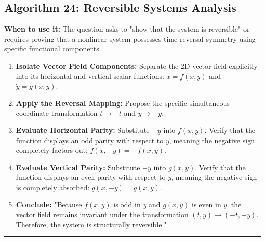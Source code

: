 \documentclass[11pt, a4paper]{report}
\begin{document}
\subsection*{Algorithm 24: Reversible Systems Analysis}
\textbf{When to use it:} The question asks to "show that the system is reversible" or requires proving that a nonlinear system possesses time-reversal symmetry using specific functional components.
\begin{enumerate}[label=\textbf{\arabic*.}]
    \item \textbf{Isolate Vector Field Components:} Separate the 2D vector field explicitly into its horizontal and vertical scalar functions: $\dot{x} = f(x,y)$ and $\dot{y} = g(x,y)$.
    \item \textbf{Apply the Reversal Mapping:} Propose the specific simultaneous coordinate transformation $t \to -t$ and $y \to -y$.
    \item \textbf{Evaluate Horizontal Parity:} Substitute $-y$ into $f(x,y)$. Verify that the function displays an odd parity with respect to $y$, meaning the negative sign completely factors out: $f(x, -y) = -f(x,y)$.
    \item \textbf{Evaluate Vertical Parity:} Substitute $-y$ into $g(x,y)$. Verify that the function displays an even parity with respect to $y$, meaning the negative sign is completely absorbed: $g(x, -y) = g(x,y)$.
    \item \textbf{Conclude:} "Because $f(x,y)$ is odd in $y$ and $g(x,y)$ is even in $y$, the vector field remains invariant under the transformation $(t,y) \to (-t,-y)$. Therefore, the system is structurally reversible."
\end{enumerate}
\vspace{1em}
\noindent\rule{\textwidth}{0.4pt}
\vspace{1em}
\end{document}

